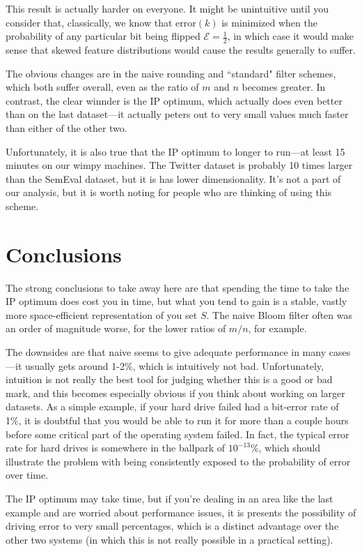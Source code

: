 \documentclass[11pt]{article}
\begin{document}
This result is actually harder on everyone. It might be unintuitive until you consider that, classically, we know that $\text{error}(k)$ is minimized when the probability of any particular bit being flipped $\mathcal{E} = \frac{1}{2}$, in which case it would make sense that skewed feature distributions would cause the results generally to suffer.

The obvious changes are in the naive rounding and ``standard" filter schemes, which both suffer overall, even as the ratio of $m$ and $n$ becomes greater. In contrast, the clear winnder is the IP optimum, which actually does even better than on the last dataset---it actually peters out to very small values much faster than either of the other two.

Unfortunately, it is also true that the IP optimum to longer to run---at least 15 minutes on our wimpy machines. The Twitter dataset is probably 10 times larger than the SemEval dataset, but it is has lower dimensionality. It's not a part of our analysis, but it is worth noting for people who are thinking of using this scheme.


\section{Conclusions}

The strong conclusions to take away here are that spending the time to take the IP optimum does cost you in time, but what you tend to gain is a stable, vastly more space-efficient representation of you set $S$. The naive Bloom filter often was an order of magnitude worse, for the lower ratios of $m / n$, for example.

The downsides are that naive seems to give adequate performance in many cases---it usually gets around 1-2\%, which is intuitively not bad. Unfortunately, intuition is not really the best tool for judging whether this is a good or bad mark, and this becomes especially obvious if you think about working on larger datasets. As a simple example, if your hard drive failed had a bit-error rate of 1\%, it is doubtful that you would be able to run it for more than a couple hours before some critical part of the operating system failed. In fact, the typical error rate for hard drives is somewhere in the ballpark of $10^{-13}$\%, which should illustrate the problem with being consistently exposed to the probability of error over time.

The IP optimum may take time, but if you're dealing in an area like the last example and are worried about performance issues, it is presents the possibility of driving error to very small percentages, which is a distinct advantage over the other two systems (in which this is not really possible in a practical setting).
\end{document}
